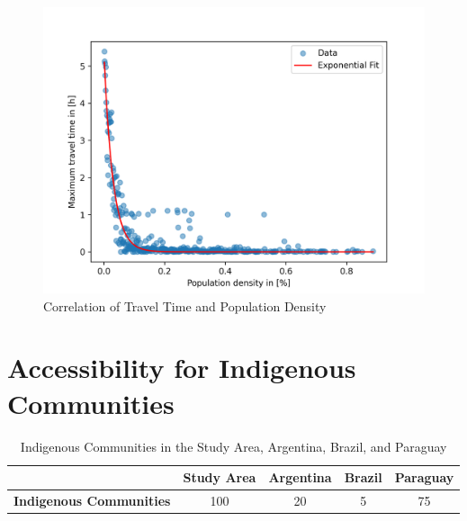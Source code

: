 \documentclass[11pt, a4paper]{report}
\begin{document}
\begin{figure}[H]
  \centering
  \includegraphics[width=0.9\linewidth]{figures/correlation.png}
  \caption{Correlation of Travel Time and Population Density}
  \label{fig:correlation}
\end{figure}

\section{Accessibility for Indigenous Communities}\label{sec:results:indigenous}

\begin{table}[h!]
\caption{Indigenous Communities in the Study Area, Argentina, Brazil, and Paraguay}
\centering
\begin{tabular}{|l|c|c|c|c|}
\hline
\textbf{} & \textbf{Study Area} & \textbf{Argentina} & \textbf{Brazil} & \textbf{Paraguay} \\ 
\hline
\textbf{Indigenous Communities }& 100& 20& 5& 75\\\hline
\end{tabular}
\label{table:indigenouscommunities}
\end{table}
\end{document}
